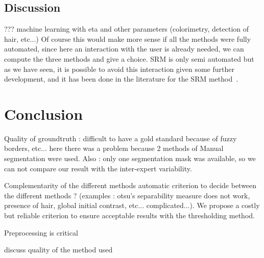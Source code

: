 \documentclass[a4paper,10pt]{article}
\begin{document}
\subsection{Discussion}
???
machine learning with eta and other parameters (colorimetry, detection of hair, etc...)
Of course this would make more sense if all the methods were fully automated, since here an interaction with the user is already needed, we can compute the three methods and give a choice.
SRM is only semi automated but as we have seen, it is possible to avoid this interaction given some further development, and it has been done in the literature for the SRM method~\cite{celebi_border_2008}. 

\section*{Conclusion}
 Quality of groundtruth : difficult to have a gold standard because of fuzzy borders, etc... here there was a problem because 2 methods of Manual segmentation were used. Also : only one segmentation mask was available, so we can not compare our result with the inter-expert variability.

 Complementarity of the different methods
 automatic criterion to decide between the different methods ? (examples : otsu's separability measure does not work, presence of hair, global initial contrast, etc... complicated...). We propose a costly but reliable criterion to ensure acceptable results with the thresholding method.
 
 Preprocessing is critical
 
discuss quality of the method used







\end{document}
